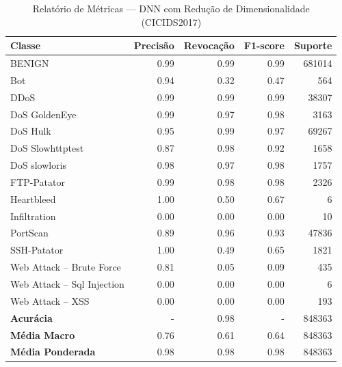 \begin{table}[H]
    \centering
    \small
    \begin{tabular}{lrrrr}
        \hline
        Classe                     & Precisão & Revocação & F1-score & Suporte \\
        \hline
        BENIGN                     & 0.99     & 0.99      & 0.99     & 681014  \\
        Bot                        & 0.94     & 0.32      & 0.47     & 564     \\
        DDoS                       & 0.99     & 0.99      & 0.99     & 38307   \\
        DoS GoldenEye              & 0.99     & 0.97      & 0.98     & 3163    \\
        DoS Hulk                   & 0.95     & 0.99      & 0.97     & 69267   \\
        DoS Slowhttptest           & 0.87     & 0.98      & 0.92     & 1658    \\
        DoS slowloris              & 0.98     & 0.97      & 0.98     & 1757    \\
        FTP-Patator                & 0.99     & 0.98      & 0.98     & 2326    \\
        Heartbleed                 & 1.00     & 0.50      & 0.67     & 6       \\
        Infiltration               & 0.00     & 0.00      & 0.00     & 10      \\
        PortScan                   & 0.89     & 0.96      & 0.93     & 47836   \\
        SSH-Patator                & 1.00     & 0.49      & 0.65     & 1821    \\
        Web Attack – Brute Force   & 0.81     & 0.05      & 0.09     & 435     \\
        Web Attack – Sql Injection & 0.00     & 0.00      & 0.00     & 6       \\
        Web Attack – XSS           & 0.00     & 0.00      & 0.00     & 193     \\
        \hline
        \textbf{Acurácia}          & -        & 0.98      & -        & 848363  \\
        \textbf{Média Macro}       & 0.76     & 0.61      & 0.64     & 848363  \\
        \textbf{Média Ponderada}   & 0.98     & 0.98      & 0.98     & 848363  \\
        \hline
    \end{tabular}
    \caption{Relatório de Métricas — DNN com Redução de Dimensionalidade (CICIDS2017)}
    \label{table:dnn_cicids_reducao_metricas}
\end{table}

